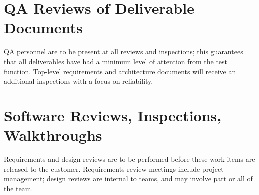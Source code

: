 \documentclass[11pt]{wacomepd}
\begin{document}
\chapter{QA Reviews of Deliverable Documents}

QA personnel are to be present at all reviews and inspections; this guarantees that all deliverables
have had a minimum level of attention from the test function.  Top-level requirements and
architecture documents will receive an additional inspections with a focus on reliability.



\chapter{Software Reviews, Inspections, Walkthroughs}

Requirements and design reviews are to be performed before these work items are released to the
customer.  Requirements review meetings include project management; design reviews are internal to
teams, and may involve part or all of the team.
\end{document}

